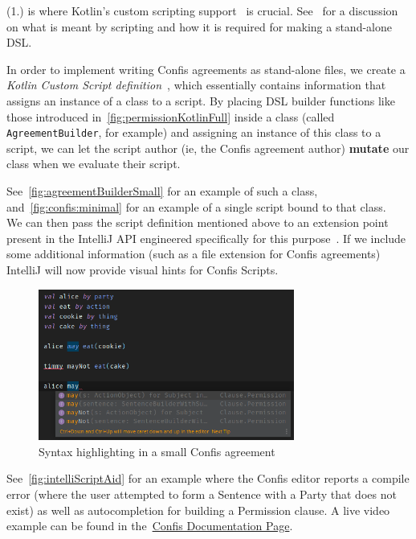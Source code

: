 (1.) is where Kotlin's custom scripting support~\cite{kotlinScriptKeep} is crucial.
See~ for a discussion on what is meant by scripting and how it is required for making a stand-alone DSL.

In order to implement writing Confis agreements as stand-alone files, we create a \emph{Kotlin Custom Script definition}~\cite{kotlinScriptKeep}, which essentially contains information that assigns an instance of a class to a script.
By placing DSL builder functions like those introduced in~\autoref{fig:permissionKotlinFull} inside a class (called \texttt{AgreementBuilder}, for example) and assigning an instance of this class to a script, we can let the script author (ie, the Confis agreement author) \textbf{mutate} our class when we evaluate their script.

See~\autoref{fig:agreementBuilderSmall} for an example of such a class, and~\autoref{fig:confis:minimal} for an example of a single script bound to that class.\\

We can then pass the script definition mentioned above to an extension point present in the IntelliJ API engineered specifically for this purpose~\cite{ideaExtensionPoints, intelliJRepo}.
If we include some additional information (such as a file extension for Confis agreements) IntelliJ will now provide visual hints for Confis Scripts.

\begin{figure}[h]
    \centering
    \includegraphics[width=0.75\textwidth]{figures/minimal.editor.highlighting.confis}
    \caption{Syntax highlighting in a small Confis agreement}
    \label{fig:intelliScriptAid}
\end{figure}

See~\autoref{fig:intelliScriptAid} for an example where the Confis editor reports a compile error (where the user attempted to form a Sentence with a Party that does not exist) as well as autocompletion for building a Permission clause.
A live video example can be found in the~\href{https://confis.dcotta.eu/0.1.1/IDE%20Support/IDEAPlugin/}{Confis Documentation Page}.\\

